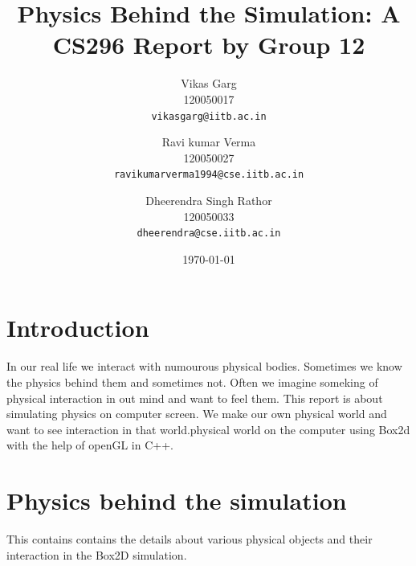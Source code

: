 \documentclass[11pt]{article}
\begin{document}
\title{\vspace{15ex}\Huge{Physics Behind the Simulation: A CS296 Report by Group 12}\vspace{15ex}}


\author{
  Vikas Garg\\120050017\\
  \texttt{vikasgarg@iitb.ac.in}\\[1 cm]
  \and
  Ravi kumar Verma\\120050027\\
  \texttt{ravikumarverma1994@cse.iitb.ac.in}
  \and 
  Dheerendra Singh Rathor\\120050033\\
  \texttt{dheerendra@cse.iitb.ac.in}\\[1 cm]
}

\date{\today}
\maketitle
\newpage

\section{Introduction}
In our real life we interact with numourous physical bodies. Sometimes we know the physics behind them and sometimes not. Often we imagine someking of physical interaction in out mind and want to feel them. 
This report is about simulating physics on computer screen. We make our own physical world and want to see interaction in that world.physical world on the computer using Box2d\cite{Box2D} with the help of openGL in C++.


\section{Physics behind the simulation}
This contains contains the details about various  physical objects and their interaction in the Box2D simulation.
\end{document}
